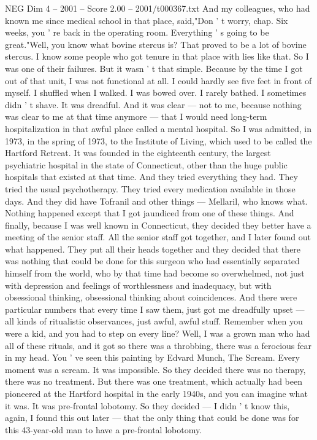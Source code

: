 \begin{textsample}{NEG Dim 4 – 2001 – Score 2.00 – 2001/t000367.txt}
And my colleagues, who had known me since medical school in that place, said,"Don ' t worry, chap.
Six weeks, you ' re back in the operating room.
Everything ' s going to be great."Well, you know what bovine stercus is?
That proved to be a lot of bovine stercus.
I know some people who got tenure in that place with lies like that.
So I was one of their failures.
But it wasn ' t that simple.
Because by the time I got out of that unit, I was not functional at all.
I could hardly see five feet in front of myself.
I shuffled when I walked.
I was bowed over.
I rarely bathed.
I sometimes didn ' t shave.
It was dreadful.
And it was clear — not to me, because nothing was clear to me at that time anymore — that I would need long-term hospitalization in that awful place called a mental hospital.
So I was admitted, in 1973, in the spring of 1973, to the Institute of Living, which used to be called the Hartford Retreat.
It was founded in the eighteenth century, the largest psychiatric hospital in the state of Connecticut, other than the huge public hospitals that existed at that time.
And they tried everything they had.
They tried the usual psychotherapy.
They tried every medication available in those days.
And they did have Tofranil and other things — Mellaril, who knows what.
Nothing happened except that I got jaundiced from one of these things.
And finally, because I was well known in Connecticut, they decided they better have a meeting of the senior staff.
All the senior staff got together, and I later found out what happened.
They put all their heads together and they decided that there was nothing that could be done for this surgeon who had essentially separated himself from the world, who by that time had become so overwhelmed, not just with depression and feelings of worthlessness and inadequacy, but with obsessional thinking, obsessional thinking about coincidences.
And there were particular numbers that every time I saw them, just got me dreadfully upset — all kinds of ritualistic observances, just awful, awful stuff.
Remember when you were a kid, and you had to step on every line?
Well, I was a grown man who had all of these rituals, and it got so there was a throbbing, there was a ferocious fear in my head.
You ' ve seen this painting by Edvard Munch, The Scream.
Every moment was a scream.
It was impossible.
So they decided there was no therapy, there was no treatment.
But there was one treatment, which actually had been pioneered at the Hartford hospital in the early 1940s, and you can imagine what it was.
It was pre-frontal lobotomy.
So they decided — I didn ' t know this, again, I found this out later — that the only thing that could be done was for this 43-year-old man to have a pre-frontal lobotomy.

\end{textsample}
